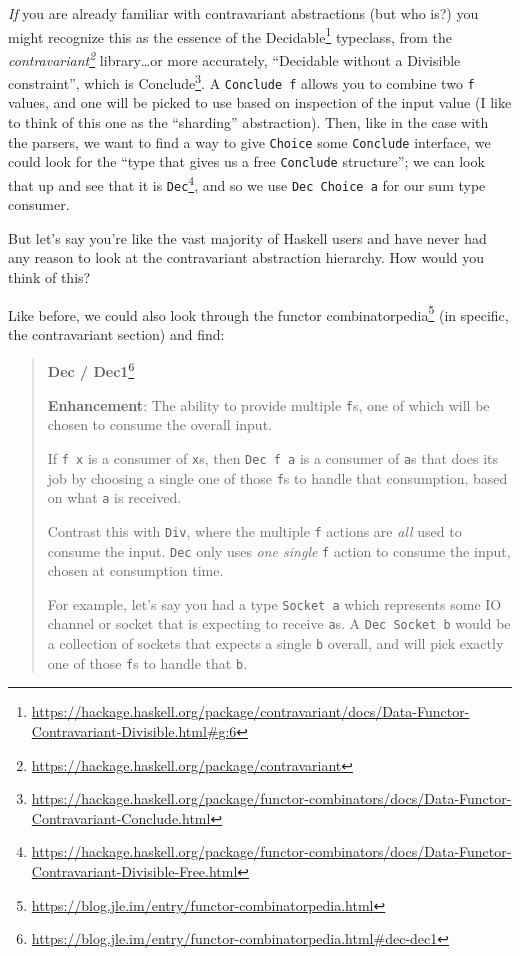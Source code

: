 \documentclass[]{article}
\renewcommand{\href}[2]{#2\footnote{\url{#1}}}
\begin{document}
\emph{If} you are already familiar with contravariant abstractions (but who is?)
you might recognize this as the essence of the
\href{https://hackage.haskell.org/package/contravariant/docs/Data-Functor-Contravariant-Divisible.html\#g:6}{Decidable}
typeclass, from the
\emph{\href{https://hackage.haskell.org/package/contravariant}{contravariant}}
library\ldots or more accurately, ``Decidable without a Divisible constraint'',
which is
\href{https://hackage.haskell.org/package/functor-combinators/docs/Data-Functor-Contravariant-Conclude.html}{Conclude}.
A \texttt{Conclude\ f} allows you to combine two \texttt{f} values, and one will
be picked to use based on inspection of the input value (I like to think of this
one as the ``sharding'' abstraction). Then, like in the case with the parsers,
we want to find a way to give \texttt{Choice} some \texttt{Conclude} interface,
we could look for the ``type that gives us a free \texttt{Conclude} structure'';
we can look that up and see that it is
\href{https://hackage.haskell.org/package/functor-combinators/docs/Data-Functor-Contravariant-Divisible-Free.html}{\texttt{Dec}},
and so we use \texttt{Dec\ Choice\ a} for our sum type consumer.

But let's say you're like the vast majority of Haskell users and have never had
any reason to look at the contravariant abstraction hierarchy. How would you
think of this?

Like before, we could also look through the
\href{https://blog.jle.im/entry/functor-combinatorpedia.html}{functor
combinatorpedia} (in specific, the contravariant section) and find:

\begin{quote}
\href{https://blog.jle.im/entry/functor-combinatorpedia.html\#dec-dec1}{\textbf{Dec
/ Dec1}}

\textbf{Enhancement}: The ability to provide multiple \texttt{f}s, one of which
will be chosen to consume the overall input.

If \texttt{f\ x} is a consumer of \texttt{x}s, then \texttt{Dec\ f\ a} is a
consumer of \texttt{a}s that does its job by choosing a single one of those
\texttt{f}s to handle that consumption, based on what \texttt{a} is received.

Contrast this with \texttt{Div}, where the multiple \texttt{f} actions are
\emph{all} used to consume the input. \texttt{Dec} only uses \emph{one single}
\texttt{f} action to consume the input, chosen at consumption time.

For example, let's say you had a type \texttt{Socket\ a} which represents some
IO channel or socket that is expecting to receive \texttt{a}s. A
\texttt{Dec\ Socket\ b} would be a collection of sockets that expects a single
\texttt{b} overall, and will pick exactly one of those \texttt{f}s to handle
that \texttt{b}.
\end{quote}
\end{document}
